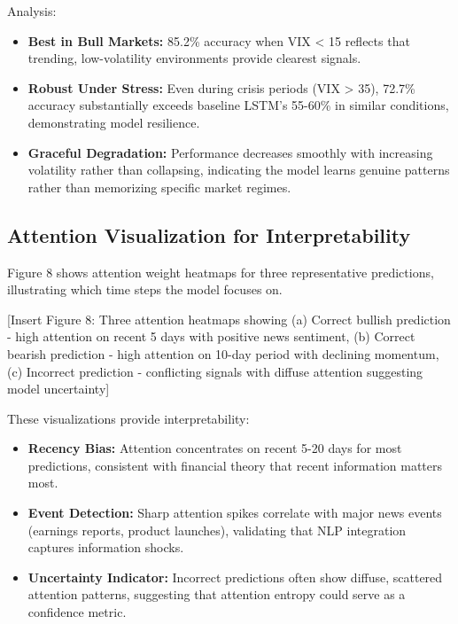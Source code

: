 \documentclass[conference]{IEEEtran}
\begin{document}
Analysis:

\begin{itemize}
\item \textbf{Best in Bull Markets:} 85.2\% accuracy when VIX < 15 reflects that trending, low-volatility environments provide clearest signals.

\item \textbf{Robust Under Stress:} Even during crisis periods (VIX > 35), 72.7\% accuracy substantially exceeds baseline LSTM's 55-60\% in similar conditions, demonstrating model resilience.

\item \textbf{Graceful Degradation:} Performance decreases smoothly with increasing volatility rather than collapsing, indicating the model learns genuine patterns rather than memorizing specific market regimes.
\end{itemize}

\subsection{Attention Visualization for Interpretability}

Figure 8 shows attention weight heatmaps for three representative predictions, illustrating which time steps the model focuses on.

[Insert Figure 8: Three attention heatmaps showing (a) Correct bullish prediction - high attention on recent 5 days with positive news sentiment, (b) Correct bearish prediction - high attention on 10-day period with declining momentum, (c) Incorrect prediction - conflicting signals with diffuse attention suggesting model uncertainty]

These visualizations provide interpretability:

\begin{itemize}
\item \textbf{Recency Bias:} Attention concentrates on recent 5-20 days for most predictions, consistent with financial theory that recent information matters most.

\item \textbf{Event Detection:} Sharp attention spikes correlate with major news events (earnings reports, product launches), validating that NLP integration captures information shocks.

\item \textbf{Uncertainty Indicator:} Incorrect predictions often show diffuse, scattered attention patterns, suggesting that attention entropy could serve as a confidence metric.
\end{itemize}
\end{document}
